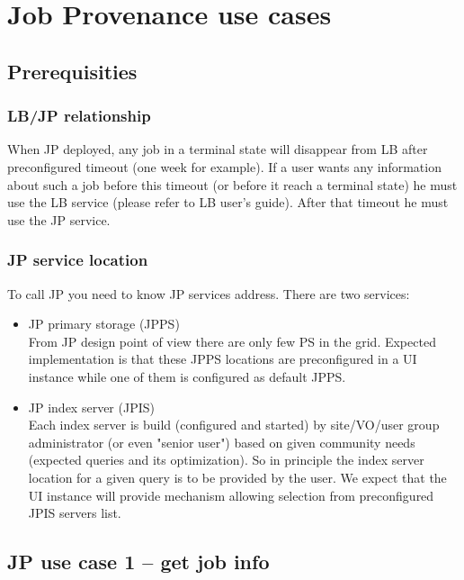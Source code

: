 \section{Job Provenance use cases}

\subsection{Prerequisities}

\subsubsection{LB/JP relationship}
When JP deployed, any job in a terminal state will disappear from LB
after preconfigured timeout (one week for example). If a user wants
any information about such a job before this timeout (or before it
reach a terminal state) he must use the LB service (please refer to LB
user's guide). After that timeout he must use the JP service.


\subsubsection{JP service location}
To call JP you need to know JP services address. There are two services:
\begin{itemize}
\item JP primary storage (JPPS)\\
  From JP design point of view there are only few PS in the
  grid. Expected implementation is that these JPPS locations
  are preconfigured in a UI instance while one of them is configured as
  default JPPS.
\item JP index server (JPIS)\\
  Each index server is build (configured and started) by site/VO/user
  group administrator (or even "senior user") based on given
  community needs (expected queries and its optimization). So in
  principle the index server location for a given query is to be
  provided by the user. We expect that the UI instance will provide
  mechanism allowing selection from preconfigured JPIS servers list.
\end{itemize}

\subsection{JP use case 1 -- get job info}

